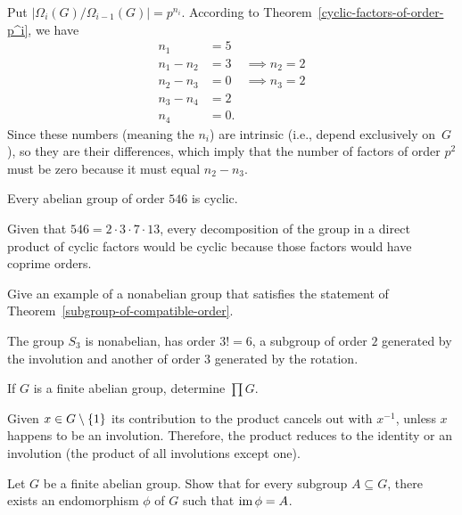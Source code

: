 \begin{solution} Put $|\Omega_i(G)/\Omega_{i-1}(G)|=p^{n_i}$. According to Theorem~\ref{cyclic-factors-of-order-p^i}, we have
\begin{align*}
    n_1 &= 5\\
    n_1 - n_2 &= 3  &\implies n_2=2\\
    n_2 - n_3 &= 0  &\implies n_3=2\\
    n_3 - n_4 &= 2\\
    n_4 &= 0.
\end{align*}
Since these numbers (meaning the $n_i$) are intrinsic (i.e., depend exclusively on~$G$), so they are their differences, which imply that the number of factors of order $p^2$ must be zero because it must equal $n_2-n_3$.  \end{solution}

\begin{exr}
    Every abelian group of order\/ $546$ is cyclic.
\end{exr}

\begin{solution} Given that $546=2\cdot3\cdot7\cdot13$, every decomposition of the group in a direct product of cyclic factors would be cyclic because those factors would have coprime orders.  \end{solution}

\begin{exr}
    Give an example of a nonabelian group that satisfies the statement of\/ \textrm{\rm Theorem~\ref{subgroup-of-compatible-order}}.
\end{exr}

\begin{solution} The group $S_3$ is nonabelian, has order $3!=6$, a subgroup of order $2$ generated by the involution and another of order $3$ generated by the rotation.  \end{solution}

\begin{exr}\label{exercise-2.1.6}
    If $G$ is a finite abelian group, determine $\prod G$.
\end{exr}

\begin{solution} Given $x\in G\setminus\{1\}$ its contribution to the product cancels out with $x^{-1}$, unless $x$ happens to be an involution. Therefore, the product reduces to the identity or an involution (the product of all involutions except one).  \end{solution}

\begin{exr}
    Let\/ $G$ be a finite abelian group. Show that for every subgroup\/ $A \subseteq G$, there exists an endomorphism\/ $\phi$ of\/ $G$ such that\/ $\operatorname{im}\phi = A$.    
\end{exr}


